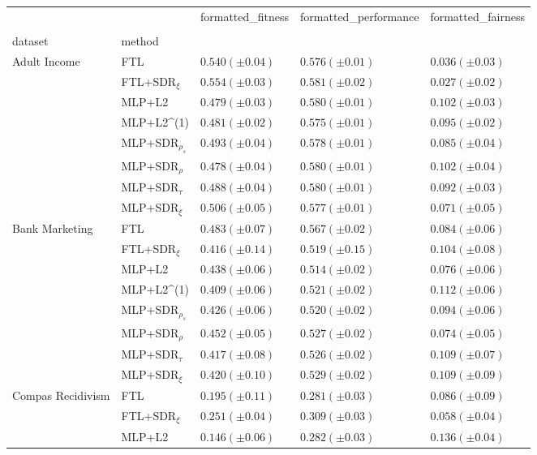 \begin{tabular}{lllll}
\toprule
 &  & formatted_fitness & formatted_performance & formatted_fairness \\
 &  &  &  &  \\
dataset & method &  &  &  \\
\midrule
\multirow[t]{8}{*}{Adult Income} & FTL & $0.540 (\pm0.04)$ & $0.576 (\pm0.01)$ & $0.036 (\pm0.03)$ \\
 & FTL+SDR$_{\xi}$ & $0.554 (\pm0.03)$ & $0.581 (\pm0.02)$ & $0.027 (\pm0.02)$ \\
 & MLP+L2 & $0.479 (\pm0.03)$ & $0.580 (\pm0.01)$ & $0.102 (\pm0.03)$ \\
 & MLP+L2^{(1)} & $0.481 (\pm0.02)$ & $0.575 (\pm0.01)$ & $0.095 (\pm0.02)$ \\
 & MLP+SDR$_{\rho_s}$ & $0.493 (\pm0.04)$ & $0.578 (\pm0.01)$ & $0.085 (\pm0.04)$ \\
 & MLP+SDR$_{\rho}$ & $0.478 (\pm0.04)$ & $0.580 (\pm0.01)$ & $0.102 (\pm0.04)$ \\
 & MLP+SDR$_{\tau}$ & $0.488 (\pm0.04)$ & $0.580 (\pm0.01)$ & $0.092 (\pm0.03)$ \\
 & MLP+SDR$_{\xi}$ & $0.506 (\pm0.05)$ & $0.577 (\pm0.01)$ & $0.071 (\pm0.05)$ \\
\cline{1-5}
\multirow[t]{8}{*}{Bank Marketing} & FTL & $0.483 (\pm0.07)$ & $0.567 (\pm0.02)$ & $0.084 (\pm0.06)$ \\
 & FTL+SDR$_{\xi}$ & $0.416 (\pm0.14)$ & $0.519 (\pm0.15)$ & $0.104 (\pm0.08)$ \\
 & MLP+L2 & $0.438 (\pm0.06)$ & $0.514 (\pm0.02)$ & $0.076 (\pm0.06)$ \\
 & MLP+L2^{(1)} & $0.409 (\pm0.06)$ & $0.521 (\pm0.02)$ & $0.112 (\pm0.06)$ \\
 & MLP+SDR$_{\rho_s}$ & $0.426 (\pm0.06)$ & $0.520 (\pm0.02)$ & $0.094 (\pm0.06)$ \\
 & MLP+SDR$_{\rho}$ & $0.452 (\pm0.05)$ & $0.527 (\pm0.02)$ & $0.074 (\pm0.05)$ \\
 & MLP+SDR$_{\tau}$ & $0.417 (\pm0.08)$ & $0.526 (\pm0.02)$ & $0.109 (\pm0.07)$ \\
 & MLP+SDR$_{\xi}$ & $0.420 (\pm0.10)$ & $0.529 (\pm0.02)$ & $0.109 (\pm0.09)$ \\
\cline{1-5}
\multirow[t]{8}{*}{Compas Recidivism} & FTL & $0.195 (\pm0.11)$ & $0.281 (\pm0.03)$ & $0.086 (\pm0.09)$ \\
 & FTL+SDR$_{\xi}$ & $0.251 (\pm0.04)$ & $0.309 (\pm0.03)$ & $0.058 (\pm0.04)$ \\
 & MLP+L2 & $0.146 (\pm0.06)$ & $0.282 (\pm0.03)$ & $0.136 (\pm0.04)$ \\

\end{tabular}
